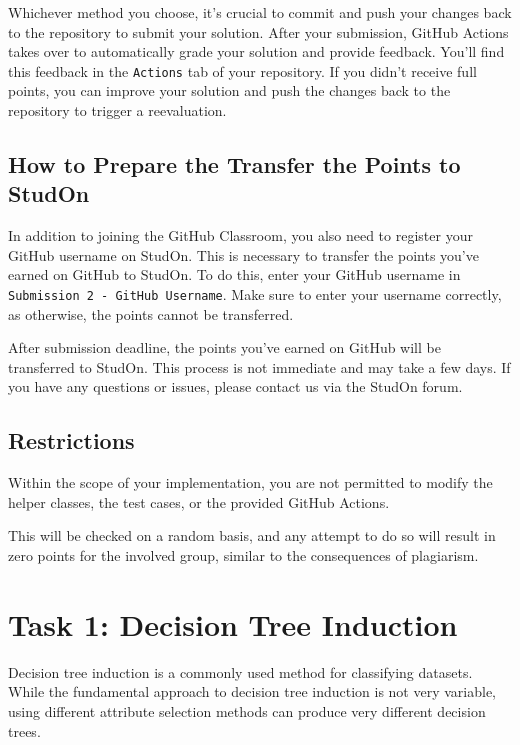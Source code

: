 \documentclass[
english,
smallborders
]{i6prcsht}
\begin{document}
Whichever method you choose, it's crucial to commit and push your changes back to the repository to submit your solution\footnotemark[\value{footnote}]. After your submission, GitHub Actions takes over to automatically grade your solution and provide feedback. You'll find this feedback in the \texttt{Actions} tab of your repository. If you didn't receive full points, you can improve your solution and push the changes back to the repository to trigger a reevaluation.

\subsection*{How to Prepare the Transfer the Points to StudOn}

In addition to joining the GitHub Classroom, you also need to register your GitHub username on StudOn. This is necessary to transfer the points you've earned on GitHub to StudOn. To do this, enter your GitHub username in \texttt{Submission 2 - GitHub Username}. Make sure to enter your username correctly, as otherwise, the points cannot be transferred.

After submission deadline, the points you've earned on GitHub will be transferred to StudOn. This process is not immediate and may take a few days. If you have any questions or issues, please contact us via the StudOn forum.

\subsection*{Restrictions}

Within the scope of your implementation, you are not permitted to modify the helper classes, the test cases, or the provided GitHub Actions.

This will be checked on a random basis, and any attempt to do so will result in zero points for the involved group, similar to the consequences of plagiarism.

\newpage

\section*{Task 1: Decision Tree Induction}
\label{sec:task-one}

Decision tree induction is a commonly used method for classifying datasets. While the fundamental approach to decision tree induction is not very variable, using different attribute selection methods can produce very different decision trees.
\end{document}
